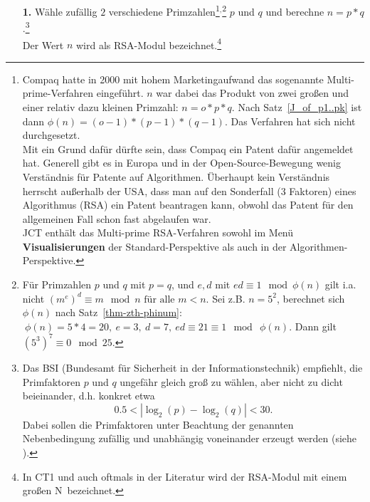 \begin{refsegment}
\begin{itemize}
\item[{\bf 1.}] Wähle zufällig $2$ verschiedene Primzahlen\footnote{%
Compaq hatte in 2000 mit hohem Marketingaufwand das sogenannte
Multi-prime-Verfahren eingeführt.
$n$ war dabei das Produkt von zwei großen und einer relativ dazu kleinen Primzahl:
$n=o*p*q.$ Nach Satz~\ref{J_of_p1..pk} ist dann $ \phi(n)= (o-1)*(p-1)*(q-1).$ Das
Verfahren hat sich nicht durchgesetzt.\\
Mit ein Grund dafür dürfte sein, dass Compaq ein Patent
dafür angemeldet hat. Generell gibt es in Europa und in der Open-Source-Bewegung
 wenig Verständnis für Patente auf Algorithmen.
Überhaupt kein Verständnis herrscht außerhalb der USA, dass man auf den
Sonderfall (3 Faktoren) eines Algorithmus (RSA) ein Patent beantragen kann,
obwohl das Patent für den allgemeinen Fall schon fast abgelaufen war.\\
   JCT enthält das Multi-prime RSA-Verfahren sowohl im
   Menü {\bf Visualisierungen} der Standard-Perspektive als auch in der
   Algorithmen-Perspektive.%
}$^,$\footnote{%
Für Primzahlen $p$ und $q$ mit $p=q$, und $e,d$ mit $ed\equiv 1 \mod \phi(n)$
gilt i.a. nicht $ (m^{e})^d \equiv m \mod n \text{ für alle } m <n.$
Sei z.B. $n=5^2$, berechnet sich $\phi(n)$ nach Satz~\ref{thm-zth-phinum}:
$~\phi(n)=5*4=20,~e=3,~d=7,~ed\equiv 21\equiv 1\mod~\phi(n).$ Dann gilt $ (5^3)^7 \equiv 0 \mod 25.$
} $p$ und $q$ und berechne $n = p*q$.\footnote{%
Das BSI  (Bundesamt für Sicherheit in der Informationstechnik) empfiehlt, die Primfaktoren $p$
und $q$ ungefähr gleich groß zu wählen, aber nicht zu dicht beieinander, d.h. konkret etwa
$$ 0.5 < |\log_2 (p) - \log_2 (q) | <30. $$ Dabei sollen die Primfaktoren unter Beachtung der genannten
Nebenbedingung zufällig und unabhängig voneinander erzeugt werden (siehe \cite{BSI2016}).
}\\
Der Wert $n$ wird als RSA-Modul bezeichnet.\footnote{%
In CT1 und auch oftmals in der Literatur wird der RSA-Modul
mit einem großen \glqq N\grqq~bezeichnet.
}


\end{itemize}
\end{refsegment}
